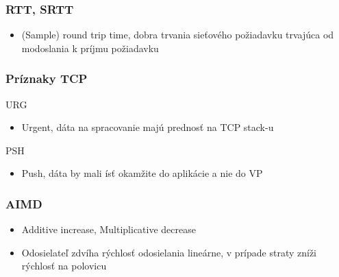 \documentclass[10pt,xcolor=pdflatex,hyperref={unicode}]{beamer}
\begin{document}
    \begin{frame}
        \frametitle{RTT, SRTT}
        \begin{itemize}
            \item (Sample) round trip time, dobra trvania sieťového požiadavku trvajúca od modoslania k príjmu požiadavku
        \end{itemize}
    \end{frame}

    \begin{frame}
        \frametitle{Príznaky TCP}
        URG
        \begin{itemize}
            \item Urgent, dáta na spracovanie majú prednosť na TCP stack-u
        \end{itemize}
        PSH
        \begin{itemize}
            \item Push, dáta by mali ísť okamžite do aplikácie a nie do VP
        \end{itemize}
    \end{frame}

    \begin{frame}
        \frametitle{AIMD}
        \begin{itemize}
            \item Additive increase, Multiplicative decrease
            \item Odosielateľ zdvíha rýchlosť odosielania lineárne, v prípade straty zníži rýchlosť na polovicu
        \end{itemize}
    \end{frame}
\end{document}
